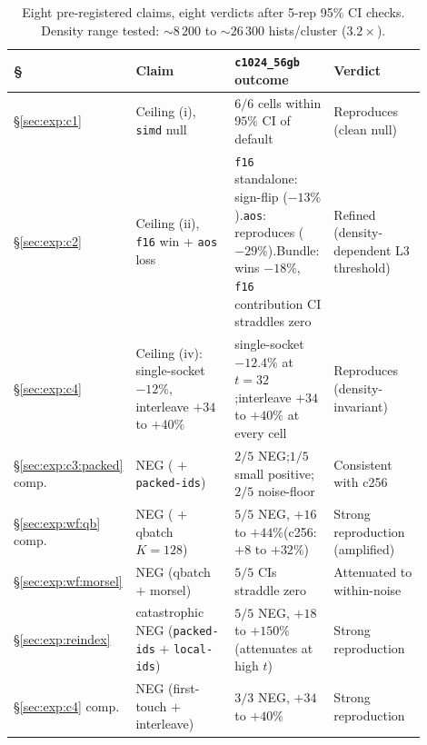 \begin{table}[H]
  \centering
  \caption[OOD structural-validation verdicts.]{Eight pre-registered claims, eight verdicts after 5-rep 95\% CI checks. Density range tested: ${\sim}8\,200$ to ${\sim}26\,300$ hists/cluster ($3.2\times$).}
  \label{tab:ood_struct}
  \footnotesize
  \begin{tabular}{>{\raggedright\arraybackslash}p{0.05\linewidth}>{\raggedright\arraybackslash}p{0.30\linewidth}>{\raggedright\arraybackslash}p{0.30\linewidth}>{\raggedright\arraybackslash}p{0.25\linewidth}}
    \toprule
    § & Claim & \texttt{c1024\_56gb} outcome & Verdict \\
    \midrule
    §\ref{sec:exp:c1} & Ceiling (i), \texttt{simd} null & $6/6$ cells within $95\%$ CI of default & Reproduces (clean null) \\
    §\ref{sec:exp:c2} & Ceiling (ii), \texttt{f16} win + \texttt{aos} loss & \texttt{f16} standalone: sign-flip ($-13\%$).\newline \texttt{aos}: reproduces ($-29\%$).\newline Bundle: wins $-18\%$, \texttt{f16} contribution CI straddles zero & Refined (density-dependent L3 threshold) \\
    §\ref{sec:exp:c4} & Ceiling (iv): single-socket $-12\%$, interleave $+34$ to $+40\%$ & single-socket $-12.4\%$ at $t{=}32$;\newline interleave $+34$ to $+40\%$ at every cell & Reproduces (density-invariant) \\
    §\ref{sec:exp:c3:packed} comp. & NEG (\bcombo{} $+$ \texttt{packed-ids}) & $2/5$ NEG;\newline $1/5$ small positive;\newline $2/5$ noise-floor & Consistent with c256 \\
    §\ref{sec:exp:wf:qb} comp. & NEG (\bcombo{} $+$ qbatch $K{=}128$) & $5/5$ NEG, $+16$ to $+44\%$\newline (c256: $+8$ to $+32\%$) & Strong reproduction (amplified) \\
    §\ref{sec:exp:wf:morsel} & NEG (qbatch $+$ morsel) & $5/5$ CIs straddle zero & Attenuated to within-noise \\
    §\ref{sec:exp:reindex} & catastrophic NEG (\texttt{packed-ids} $+$ \texttt{local-ids}) & $5/5$ NEG, $+18$ to $+150\%$\newline (attenuates at high $t$) & Strong reproduction \\
    §\ref{sec:exp:c4} comp. & NEG (first-touch $+$ interleave) & $3/3$ NEG, $+34$ to $+40\%$ & Strong reproduction \\
    \bottomrule
  \end{tabular}
\end{table}

